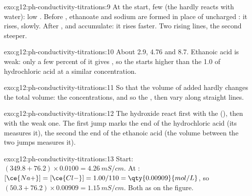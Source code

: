 \begin{solution}{exo:g12:ph-conductivity-titrations:9}
At the start, few  (the  hardly reacts with water): low
. Before , ethanoate and sodium  are formed
in place of uncharged : it rises, slowly. After ,
 and  accumulate: it rises faster. Two rising lines,
the second steeper.
\end{solution}

\begin{solution}{exo:g12:ph-conductivity-titrations:10}
About 2.9, 4.76 and 8.7. Ethanoic acid is weak: only a few percent of it
gives , so the  starts higher than the 1.0 of hydrochloric
acid at a similar concentration.
\end{solution}

\begin{solution}{exo:g12:ph-conductivity-titrations:11}
So that the volume of  added hardly changes the total volume: the
concentrations, and so the , then vary along straight lines.
\end{solution}

\begin{solution}{exo:g12:ph-conductivity-titrations:12}
The hydroxide  react first with the  (), then
with the weak one. The first jump marks the end of the hydrochloric acid
(its  measures it), the second the end of the ethanoic
acid (the volume between the two jumps measures it).
\end{solution}

\begin{solution}{exo:g12:ph-conductivity-titrations:13}
Start: $(349.8 + 76.2) \times 0.0100 = \qty{4.26}{mS/cm}$. At
: $[\ce{Na+}] = [\ce{Cl-}] = 1.00/110 = \qty{0.00909}{mol/L}$,
so $(50.3 + 76.2) \times 0.00909 = \qty{1.15}{mS/cm}$. Both as on the
figure.
\end{solution}

